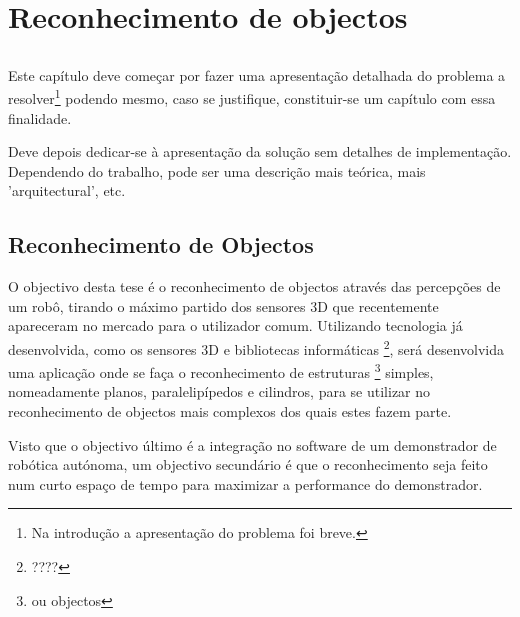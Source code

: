 \chapter{Reconhecimento de objectos}\label{chap:chap3}

\section*{}

Este capítulo deve começar por fazer uma apresentação detalhada do
problema a resolver\footnote{Na introdução a apresentação do
  problema foi breve.} podendo mesmo, caso se justifique,
constituir-se um capítulo com essa finalidade.

Deve depois dedicar-se à apresentação da solução sem detalhes de
implementação. 
Dependendo do trabalho, pode ser uma descrição mais teórica, mais
'arquitectural', etc.

\section{Reconhecimento de Objectos}



O objectivo desta tese é o reconhecimento de objectos através das percepções de um 
robô, tirando o máximo partido dos sensores 3D que recentemente apareceram no mercado para o
utilizador comum. Utilizando tecnologia já desenvolvida, como os sensores 3D e bibliotecas
informáticas \footnote{????}, será desenvolvida uma aplicação onde se faça o reconhecimento de
estruturas \footnote{ou objectos} simples, nomeadamente planos, paralelipípedos e cilindros, para
se utilizar no reconhecimento de objectos mais complexos dos quais estes fazem parte.

Visto que o objectivo último é a integração no software de um demonstrador de robótica autónoma,
um objectivo secundário é que o reconhecimento seja feito num curto espaço de tempo para maximizar
a performance do demonstrador.

%

